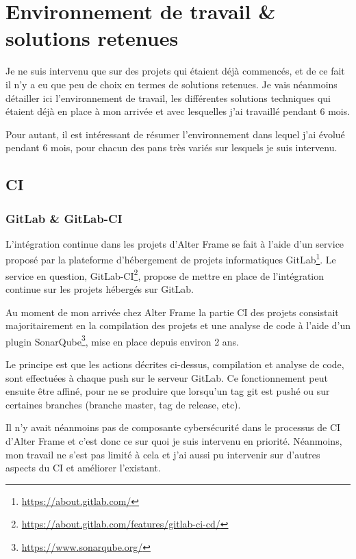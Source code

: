 \section{Environnement de travail \& solutions retenues}
Je ne suis intervenu que sur des projets qui étaient déjà commencés, et de ce fait il n'y a eu que peu de choix en termes de solutions retenues. Je vais néanmoins détailler ici l'environnement de travail, les différentes solutions techniques qui étaient déjà en place à mon arrivée et avec lesquelles j'ai travaillé pendant 6 mois.

Pour autant, il est intéressant de résumer l'environnement dans lequel j'ai évolué pendant 6 mois, pour chacun des pans très variés sur lesquels je suis intervenu.

\subsection{CI}
\subsubsection{GitLab \& GitLab-CI}
L'intégration continue dans les projets d'Alter Frame se fait à l'aide d'un service proposé par la plateforme d'hébergement de projets informatiques GitLab\footnote{\url{https://about.gitlab.com/}}. Le service en question, GitLab-CI\footnote{\url{https://about.gitlab.com/features/gitlab-ci-cd/}}, propose de mettre en place de l'intégration continue sur les projets hébergés sur GitLab.

Au moment de mon arrivée chez Alter Frame la partie CI des projets consistait majoritairement en la compilation des projets et une analyse de code à l'aide d'un plugin SonarQube\footnote{\url{https://www.sonarqube.org/}}, mise en place depuis environ 2 ans.

Le principe est que les actions décrites ci-dessus, compilation et analyse de code, sont effectuées à chaque push sur le serveur GitLab. Ce fonctionnement peut ensuite être affiné, pour ne se produire que lorsqu'un tag git est pushé ou sur certaines branches (branche master, tag de release, etc).

Il n'y avait néanmoins pas de composante cybersécurité dans le processus de CI d'Alter Frame et c'est donc ce sur quoi je suis intervenu en priorité. Néanmoins, mon travail ne s'est pas limité à cela et j'ai aussi pu intervenir sur d'autres aspects du CI et améliorer l'existant.

